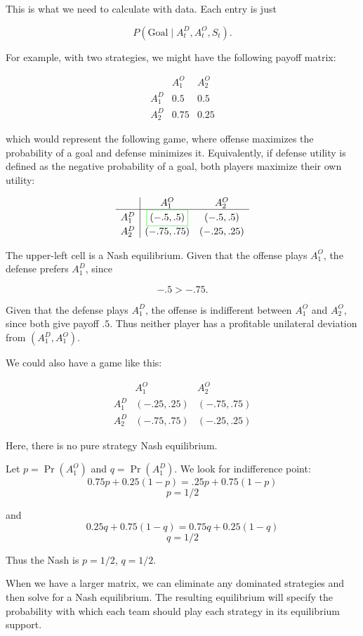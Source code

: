 \documentclass[11pt,english]{article}
\begin{document}
This is what we need to calculate with data. Each entry is just

\[
P(\text{Goal} \mid A_t^D, A_t^O, S_t).
\]

For example, with two strategies, we might have the following
payoff matrix:

$$
\begin{array}{c|cc}
    & A_1^O & A_2^O \\ \hline
A_1^D & 0.5 & 0.5 \\
A_2^D & 0.75 & 0.25
\end{array}
$$

which would represent the following game, where offense maximizes
the probability of a goal and defense minimizes it. Equivalently,
if defense utility is defined as the negative probability of a goal,
both players maximize their own utility:

$$
\begin{array}{c|cc}
    & A_1^O & A_2^O \\ \hline
A_1^D & \fcolorbox{green}{white}{$(-.5,.5)$} & (-.5,.5) \\
A_2^D & (-.75,.75) & (-.25,.25)
\end{array}
$$

The upper-left cell is a Nash equilibrium. Given that the offense
plays $A_1^O$, the defense prefers $A_1^D$, since

$$
-.5 > -.75.
$$

Given that the defense plays $A_1^D$, the offense is indifferent
between $A_1^O$ and $A_2^O$, since both give payoff $.5$.
Thus neither player has a profitable unilateral deviation from
$(A_1^D,A_1^O)$.


We could also have a game like this:

\[
\begin{array}{c|cc}
    & A_1^O & A_2^O \\ \hline
A_1^D & (-.25,.25) & (-.75,.75) \\
A_2^D & (-.75,.75) & (-.25,.25)
\end{array}
\]

Here, there is no pure strategy Nash equilibrium.

Let $p = \Pr(A_1^O)$ and $q = \Pr(A_1^D)$. We look for indifference
point:
\[
0.75p + 0.25(1-p) = .25p + 0.75(1-p)
\]
\[
p = 1/2
\]

and
\[
0.25q + 0.75(1-q) = 0.75q + 0.25(1-q)
\]
\[
q = 1/2
\]

Thus the Nash is $p = 1/2$, $q = 1/2$.

When we have a larger matrix, we can eliminate any dominated strategies and then solve for a Nash equilibrium. The resulting equilibrium will specify the probability with which each team should play each strategy in its equilibrium support.
\end{document}
